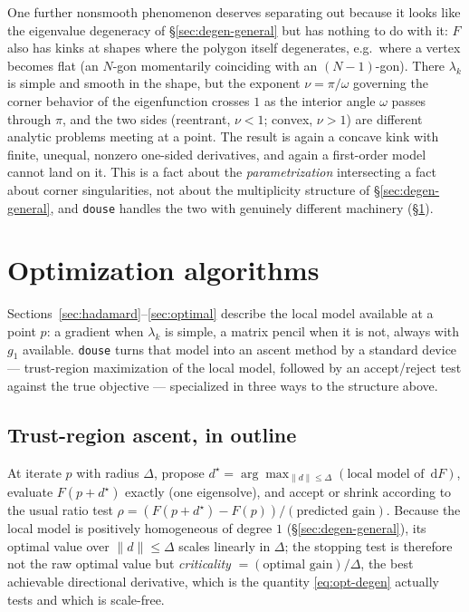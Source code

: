 \documentclass[11pt]{article}
\newcommand{\dd}{\,\mathrm{d}}
\newcommand{\code}[1]{\texttt{#1}}
\theoremstyle{plain}
\begin{document}
One further nonsmooth phenomenon deserves separating out because it looks like the eigenvalue
degeneracy of \S\ref{sec:degen-general} but has nothing to do with it: $F$ also has kinks at
shapes where the polygon itself degenerates, e.g.\ where a vertex becomes flat (an $N$-gon
momentarily coinciding with an $(N-1)$-gon). There $\lambda_k$ is simple and smooth in the shape,
but the exponent $\nu=\pi/\omega$ governing the corner behavior of the eigenfunction crosses $1$
as the interior angle $\omega$ passes through $\pi$, and the two sides (reentrant, $\nu<1$;
convex, $\nu>1$) are different analytic problems meeting at a point. The result is again a
concave kink with finite, unequal, nonzero one-sided derivatives, and again a first-order model
cannot land on it. This is a fact about the \emph{parametrization} intersecting a fact about
corner singularities, not about the multiplicity structure of \S\ref{sec:degen-general}, and
\code{douse} handles the two with genuinely different machinery (\S\ref{sec:algorithms}).

\section{Optimization algorithms}\label{sec:algorithms}

Sections~\ref{sec:hadamard}--\ref{sec:optimal} describe the local model available at a point $p$:
a gradient when $\lambda_k$ is simple, a matrix pencil when it is not, always with $g_1$ available.
\code{douse} turns that model into an ascent method by a standard device --- trust-region maximization
of the local model, followed by an accept/reject test against the true objective --- specialized in
three ways to the structure above.

\subsection{Trust-region ascent, in outline}

At iterate $p$ with radius $\Delta$, propose $d^\star=\arg\max_{\|d\|\le\Delta}(\text{local model
of }\dd F)$, evaluate $F(p+d^\star)$ exactly (one eigensolve), and accept or shrink according to
the usual ratio test $\rho=(F(p+d^\star)-F(p))/(\text{predicted gain})$. Because the local model is
positively homogeneous of degree $1$ (\S\ref{sec:degen-general}), its optimal value over
$\|d\|\le\Delta$ scales linearly in $\Delta$; the stopping test is therefore not the raw optimal
value but \emph{criticality} $=(\text{optimal gain})/\Delta$, the best achievable directional
derivative, which is the quantity \eqref{eq:opt-degen} actually tests and which is scale-free.
\end{document}
